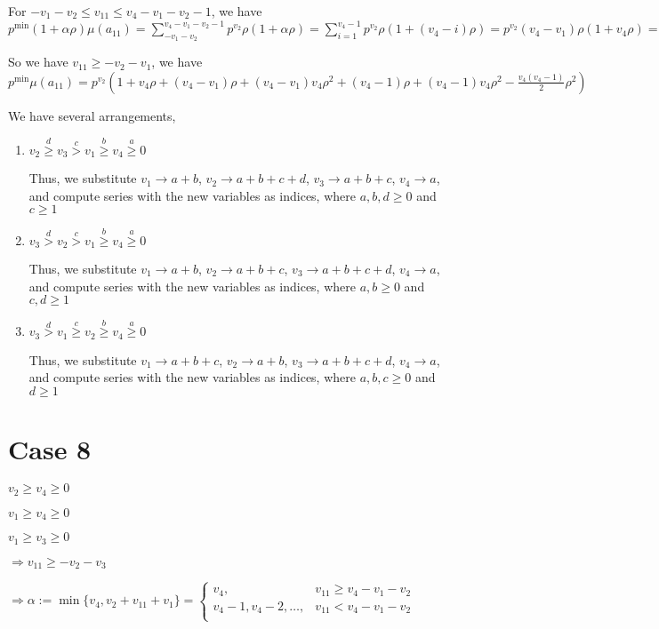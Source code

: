 \documentclass{article}
\begin{document}
For $-v_1-v_2\leq{v_{11}}\leq{v_4-v_1-v_2-1}$, we have $p^{\min}(1+\alpha\rho)\mu(a_{11})=\sum_{-v_1-v_2}^{v_4-v_1-v_2-1}p^{v_2}\rho(1+\alpha\rho)=\sum_{i=1}^{v_4-1}p^{v_2}\rho(1+(v_4-i)\rho)=p^{v_2}(v_4-v_1)\rho(1+v_4\rho)=p^{v_2}((v_4-v_1)\rho+(v_4-v_1)v_4\rho^2)=p^{v_2}((v_4-1)\rho+(v_4-1)v_4\rho^2-\binom{v_4}{2}\rho^2).$

So we have $v_{11}\geq{-v_2-v_1}$, we have $p^{\min}\mu(a_{11})=p^{v_2}(1+v_4\rho+(v_4-v_1)\rho+(v_4-v_1)v_4\rho^2+(v_4-1)\rho+(v_4-1)v_4\rho^2-\frac{v_4(v_4-1)}{2}\rho^2)$

We have several arrangements,
\begin{enumerate}
    \item 
$v_2\overset{d}{\geq}v_3\overset{c}{>}v_1\overset{b}{\geq}{v_4}\overset{a}{\geq}{0}$

Thus, we substitute $v_1\rightarrow{a+b}$, $v_2\rightarrow{a+b+c+d}$, $v_3\rightarrow{a+b+c}$, $v_4\rightarrow{a}$, and compute series with the new variables as indices, where $a,b,d\geq{0}$ and $c\geq{1}$    
\item 
$v_3\overset{d}{>}v_2\overset{c}{>}v_1\overset{b}{\geq}{v_4}\overset{a}{\geq}{0}$

Thus, we substitute $v_1\rightarrow{a+b}$, $v_2\rightarrow{a+b+c}$, $v_3\rightarrow{a+b+c+d}$, $v_4\rightarrow{a}$, and compute series with the new variables as indices, where $a,b\geq{0}$ and $c,d\geq{1}$
    \item 
$v_3\overset{d}{>}v_1\overset{c}{\geq}v_2\overset{b}{\geq}{v_4}\overset{a}{\geq}{0}$

Thus, we substitute $v_1\rightarrow{a+b+c}$, $v_2\rightarrow{a+b}$, $v_3\rightarrow{a+b+c+d}$, $v_4\rightarrow{a}$, and compute series with the new variables as indices, where $a,b,c\geq{0}$ and $d\geq{1}$

\end{enumerate}
\section{Case 8}
$v_2\geq{v_4}\geq{0}$

$v_1\geq{v_4}\geq{0}$

$v_1\geq{v_3}\geq{0}$

$\Rightarrow{v_{11}}\geq{-v_2-v_3}$

$\Rightarrow\alpha:=\min\{v_4,v_2+v_{11}+v_1\}=\begin{cases}
       v_4, & v_{11}\geq{v_4-v_1-v_2}\\
       v_4-1,v_4-2,\dots, & v_{11}<{v_4-v_1-v_2}\\
     \end{cases}$
\end{document}
